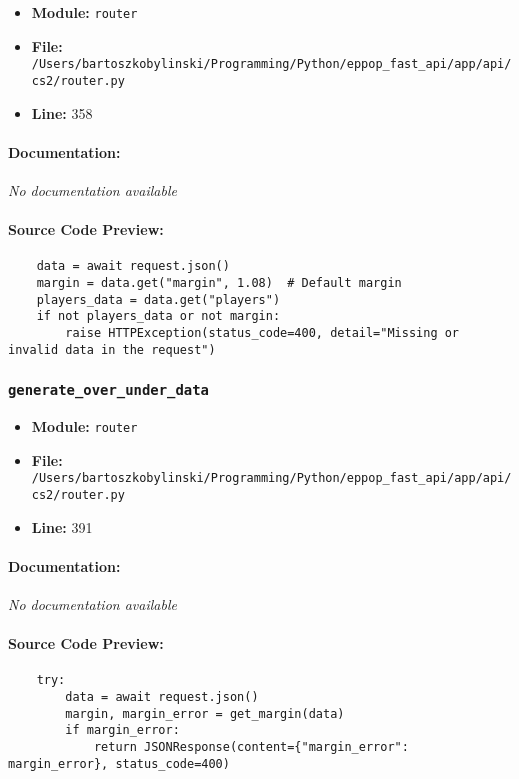 \documentclass[11pt,a4paper]{article}
\begin{document}
\begin{itemize}
    \item \textbf{Module:} \texttt{router}
    \item \textbf{File:} \texttt{/Users/bartoszkobylinski/Programming/Python/eppop\_fast\_api/app/api/cs2/router.py}
    \item \textbf{Line:} 358
\end{itemize}

\paragraph{Documentation:} \textit{No documentation available}

\paragraph{Source Code Preview:}
\begin{verbatim}
    data = await request.json()
    margin = data.get("margin", 1.08)  # Default margin
    players_data = data.get("players")
    if not players_data or not margin:
        raise HTTPException(status_code=400, detail="Missing or invalid data in the request")
\end{verbatim}

\vspace{1em}
\subsubsection{\texttt{generate\_over\_under\_data}}

\begin{itemize}
    \item \textbf{Module:} \texttt{router}
    \item \textbf{File:} \texttt{/Users/bartoszkobylinski/Programming/Python/eppop\_fast\_api/app/api/cs2/router.py}
    \item \textbf{Line:} 391
\end{itemize}

\paragraph{Documentation:} \textit{No documentation available}

\paragraph{Source Code Preview:}
\begin{verbatim}
    try:
        data = await request.json()
        margin, margin_error = get_margin(data)
        if margin_error:
            return JSONResponse(content={"margin_error": margin_error}, status_code=400)
\end{verbatim}
\end{document}
